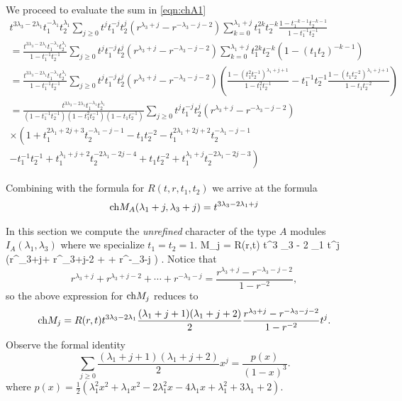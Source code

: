 \documentclass[11pt]{amsart}
\begin{document}
We proceed to evaluate the sum in \eqref{eqn:chA1}
\begin{multline}
t^{3\lambda_3-2 \lambda_1} t_1^{-\lambda_1} t_2^{\lambda_1} \sum_{j \geq 0} t^j t_1^{-j} t_2^{j} \left(r^{\lambda_3+j}-r^{-\lambda_3-j-2}\right) \sum_{k=0}^{\lambda_1 + j}t_1^{2k} t_2^{-k} \frac{1 - t_1^{-k-1} t_2^{-k-1}}{1-t_1^{-1} t_2^{-1}}  \\
= \frac{t^{3\lambda_3-2 \lambda_1} t_1^{-\lambda_1} t_2^{\lambda_1}}{1-t_1^{-1} t_2^{-1}} \sum_{j\geq 0} t^j t_1^{-j} t_2^{j} \left(r^{\lambda_3+j}-r^{-\lambda_3-j-2}\right) \sum_{k=0}^{\lambda_1 + j} t_1^{2k} t_2^{-k} \left(1 - (t_1t_2)^{-k-1}\right) \\
= \frac{t^{3\lambda_3-2 \lambda_1} t_1^{-\lambda_1} t_2^{\lambda_1}}{1-t_1^{-1} t_2^{-1}} \sum_{j\geq 0} t^j t_1^{-j} t_2^{j} \left(r^{\lambda_3+j}-r^{-\lambda_3-j-2}\right) \left(\frac{1 - (t_1^2 t_2^{-1})^{\lambda_1 + j + 1}}{1 - t_1^2 t_2^{-1}} - t_1^{-1} t_2^{-1} \frac{1 - (t_1 t_2^{-2})^{\lambda_1 + j + 1}}{1 - t_1 t_2^{-2}} \right) \\ = \frac{t^{3\lambda_3-2 \lambda_1} t_1^{-\lambda_1} t_2^{\lambda_1}}{(1-t_1^{-1} t_2^{-1})(1 - t_1^2 t_2^{-1})(1-t_1t_2^{-1})} \sum_{j\geq 0} t^j t_1^{-j} t_2^{j} \left(r^{\lambda_3+j}-r^{-\lambda_3-j-2}\right) \\ \times \left(1 + t_1^{2\lambda_1 +2j+3}t_2^{-\lambda_1-j-1} - t_1 t_2^{-2} - t_1^{2 \lambda_1 + 2j + 2} t_2^{-\lambda_1 - j -1} \right. \\ \left. - t_1^{-1} t_2^{-1} + t_1^{\lambda_1+j+2} t_2^{-2 \lambda_1 - 2j-4} + t_1 t_2^{-2} + t_1^{\lambda_1 + j} t_2^{-2\lambda_1 - 2 j - 3} \right)
\end{multline}

Combining with the formula for $R(t,r,t_1,t_2)$ we arrive at the formula
\begin{multline} 
{\rm ch} M_A(\lambda_1+j,\lambda_3+j) = t^{3 \lambda_3 - 2 \lambda_1+j} 
\end{multline}


\parsec
In this section we compute the {\em unrefined} character of the type $A$ modules $I_A(\lambda_1,\lambda_3)$ where we specialize $t_1=t_2=1$.
\beqn
\ch M_j = R(r,t) t^{3 \lambda_3 - 2 \lambda_1}  t^j \left(r^{\lambda_3+j}+ r^{\lambda_3+j-2} + \cdots + r^{-\lambda_3-j} \right) .
\eeqn
Notice that 
\[
r^{\lambda_3+j}+ r^{\lambda_3+j-2} + \cdots + r^{-\lambda_3-j} = \frac{r^{\lambda_3+j}-r^{-\lambda_3-j-2}}{1-r^{-2}} ,
\]
so the above expression for ${\rm ch} M_j$ reduces to
\[
{\rm ch} M_j = R(r,t) t^{3 \lambda_3 - 2 \lambda_1} \frac{(\lambda_1+j+1)(\lambda_1+j+2)}{2} \frac{r^{\lambda_3+j}-r^{-\lambda_3-j-2}}{1-r^{-2}} t^j .
\]
Observe the formal identity 
\[
\sum_{j \geq 0} \frac{(\lambda_1+j+1)(\lambda_1+j+2)}{2} x^j = \frac{p(x)}{(1-x)^3}  .
\]
where $p(x) = \frac12 \left(\lambda_1^2 x^2 + \lambda_1 x^2 - 2\lambda_1^2x -4 \lambda_1 x + \lambda_1^2 + 3\lambda_1 +2\right)$. 
\end{document}
